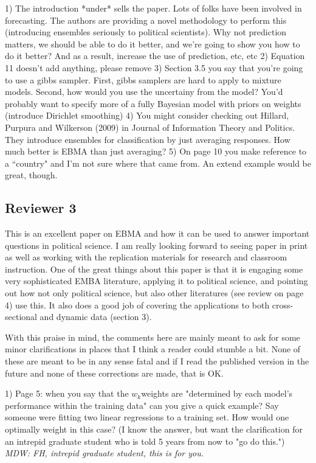 \documentclass[10pt]{article}
\begin{document}
1) The introduction *under* sells the paper.  Lots of folks have been involved in forecasting.  The authors are providing a novel methodology to perform this (introducing ensembles seriously to political scientists).  Why not prediction matters, we should be able to do it better, and we're going to show you how to do it better?  And as a result, increase the use of prediction, etc, etc
2) Equation 11 doesn't add anything, please remove
3) Section 3.5 you say that you're going to use a gibbs sampler.  First, gibbs samplers are hard to apply to mixture models.  Second, how would you use the uncertainy from the model?  You'd probably want to specify more of a fully Bayesian model with priors on weights (introduce Dirichlet smoothing)
4) You might consider checking out Hillard, Purpura and Wilkerson (2009) in Journal of Information Theory and Politics.  They introduce ensembles for classification by just averaging responses.  How much better is EBMA than just averaging?
5) On page 10 you make reference to a ``country" and I'm not sure where that came from.  An extend example would be great, though.  

\subsection{Reviewer 3}

This is an excellent paper on EBMA and how it can be used to answer important questions in political science.  I am really looking forward to seeing paper in print as well as working with the replication materials for research and classroom instruction.  One of the great things about this paper is that it is engaging some very sophisticated EMBA literature, applying it to political science, and pointing out how not only political science, but also other literatures (see review on page 4) use this.  It also does a good job of covering the applications to both cross-sectional and dynamic data (section 3).

With this praise in mind, the comments here are mainly meant to ask for some minor clarifications in places that I think a reader could stumble a bit.  None of these are meant to be in any sense fatal and if I read the published version in the future and none of these corrections are made, that is OK.

1) Page 5: when you say that the $w_k $weights are "determined by each model's performance within the training data" can you give a quick example?  Say someone were fitting two linear regressions to a training set. How would one optimally weight in this case? (I know the answer, but want the clarification for an intrepid graduate student who is told 5 years from now to "go do this.")
{\it MDW: FH, intrepid graduate student, this is for you.}
\end{document}
